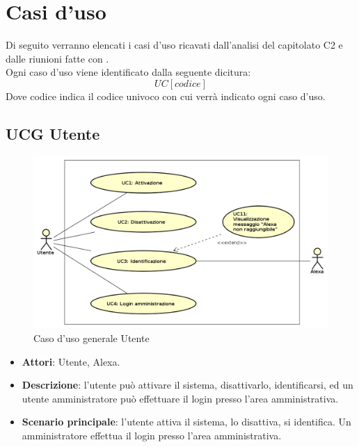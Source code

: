 \documentclass[../AnalisiDeiRequisiti_v3.0.0.tex]{subfiles}
\begin{document}
\section{Casi d'uso}
Di seguito verranno elencati i casi d'uso ricavati dall'analisi del capitolato C2 e dalle riunioni fatte con \prop.\\
Ogni caso d'uso viene identificato dalla seguente dicitura:
\begin{equation*}
	UC[codice]
\end{equation*}
Dove codice indica il codice univoco con cui verrà indicato ogni caso d'uso.

\subsection{UCG Utente} 
\label{sssec:UCG_Utente}
\begin{figure}[!h]
	\centering
	\includegraphics[width=\textwidth]{UseCases/UCG_Utente/UCG_Utente.png}
	\caption{Caso d'uso generale Utente}
\end{figure}
\begin{itemize} 
\item \textbf{Attori}: Utente, Alexa.
\item \textbf{Descrizione}: l'utente può attivare il sistema, disattivarlo, identificarsi, ed un utente amministratore può effettuare il login presso l'area amministrativa.
\item \textbf{Scenario principale}: l'utente attiva il sistema, lo disattiva, si identifica. Un amministratore effettua il login presso l'area amministrativa.
\end{itemize}
\newpage
\end{document}
